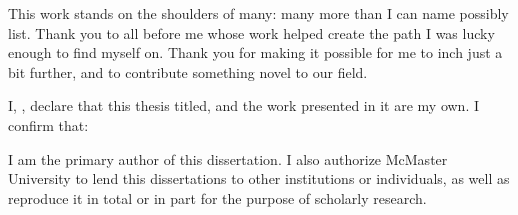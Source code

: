 \documentclass[
11pt, %
oneside, %
english, %
singlespacing, %
]{macthesis} %
\def\blankpage{%
      \clearpage%
      \thispagestyle{empty}%
      \addtocounter{page}{-1}%
      \null%
      \clearpage}
\begin{document}
\begin{acknowledgements}
    This work stands on the shoulders of many: many more than I can name possibly list. Thank you to all before me whose work helped create the path I was lucky enough to find myself on. Thank you for making it possible for me to inch just a bit further, and to contribute something novel to our field.
  \end{acknowledgements}
\blankpage
\clearpage


\tableofcontents %

\listoffigures %

\listoftables %



\begin{declaration}
\addchaptertocentry{\authorshipname}

\noindent I, \authorname, declare that this thesis titled, \emph{\ttitle} and the work presented in it are my own. I confirm that:

I am the primary author of this dissertation. I also authorize McMaster University to lend this dissertations to other institutions or individuals, as well as reproduce it in total or in part for the purpose of scholarly research.

\end{declaration}


\label{lastoffront}
\clearpage
\end{document}
